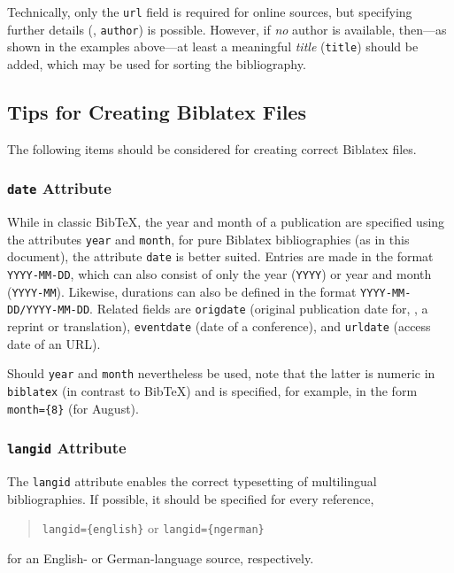 Technically, only the \texttt{url} field is required for online
sources, but specifying further details (\eg, \texttt{author}) is possible.
However, if \emph{no} author is available, then---as shown in the examples
above---at least a meaningful \emph{title} (\texttt{title}) should be added,
which may be used for sorting the bibliography.

\subsection{Tips for Creating Biblatex Files}
\label{sec:tips-on-biblatex}

The following items should be considered for creating correct Biblatex
files.

\subsubsection{\texttt{date} Attribute}

While in classic BibTeX, the year and month of a publication are specified using
the attributes \texttt{year} and \texttt{month}, for pure Biblatex
bibliographies (as in this document), the attribute \texttt{date} is better
suited. Entries are made in the format \texttt{YYYY-MM-DD}, which can also
consist of only the year (\texttt{YYYY}) or year and month (\texttt{YYYY-MM}).
Likewise, durations can also be defined in the format
\texttt{YYYY-MM-DD/YYYY-MM-DD}. Related fields are \texttt{origdate} (original
publication date for, \eg, a reprint or translation), \texttt{eventdate} (date
of a conference), and \texttt{urldate} (access date of an URL).

Should \texttt{year} and \texttt{month} nevertheless be used, note that the
latter is numeric in \texttt{biblatex} (in contrast to BibTeX) and is specified,
for example, in the form \verb!month={8}! (for August).

\subsubsection{\texttt{langid} Attribute}

The \texttt{langid} attribute enables the correct typesetting of multilingual
bibliographies. If possible, it should be specified for every reference, \eg
%
\begin{quote}
\verb!langid={english}! \quad or \quad \verb!langid={ngerman}!
\end{quote}
%
for an English- or German-language source, respectively.

